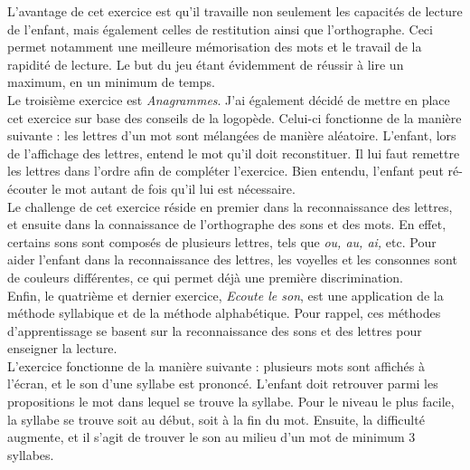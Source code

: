 L'avantage de cet exercice est qu'il travaille non seulement les capacités de lecture de l'enfant, mais également celles de restitution ainsi que l'orthographe. Ceci permet notamment une meilleure mémorisation des mots et le travail de la rapidité de lecture. Le but du jeu étant évidemment de réussir à lire un maximum, en un minimum de temps. \\

Le troisième exercice est \textit{Anagrammes}. J'ai également décidé de mettre en place cet exercice sur base des conseils de la logopède. Celui-ci fonctionne de la manière suivante : les lettres d'un mot sont mélangées de manière aléatoire. L'enfant, lors de l'affichage des lettres, entend le mot qu'il doit reconstituer. Il lui faut remettre les lettres dans l'ordre afin de compléter l'exercice. Bien entendu, l'enfant peut ré-écouter le mot autant de fois qu'il lui est nécessaire.\\

Le challenge de cet exercice réside en premier dans la reconnaissance des lettres, et ensuite dans la connaissance de l'orthographe des sons et des mots. En effet, certains sons sont composés de plusieurs lettres, tels que \textit{ou, au, ai,} etc. Pour aider l'enfant dans la reconnaissance des lettres, les voyelles et les consonnes sont de couleurs différentes, ce qui permet déjà une première discrimination.\\

Enfin, le quatrième et dernier exercice, \textit{Ecoute le son}, est une application de la méthode syllabique et de la méthode alphabétique. Pour rappel, ces méthodes d'apprentissage se basent sur la reconnaissance des sons et des lettres pour enseigner la lecture.\\

L'exercice fonctionne de la manière suivante : plusieurs mots sont affichés à l'écran, et le son d'une syllabe est prononcé. L'enfant doit retrouver parmi les propositions le mot dans lequel se trouve la syllabe. Pour le niveau le plus facile, la syllabe se trouve soit au début, soit à la fin du mot. Ensuite, la difficulté augmente, et il s'agit de trouver le son au milieu d'un mot de minimum 3 syllabes.



